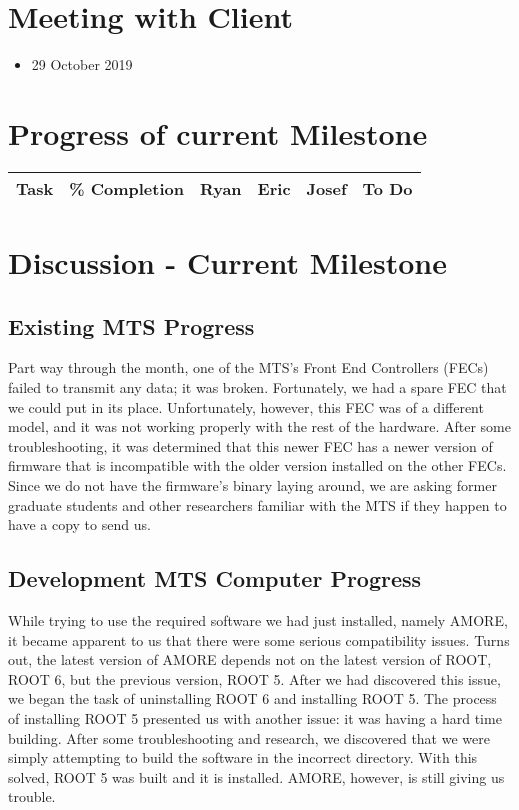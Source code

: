 \documentclass[12pt]{article}
\newcommand\tab[1][1cm]{\hspace*{#1}}
\begin{document}
\section{Meeting with Client}

\begin{itemize}
\item[] 29 October 2019
\end{itemize}

\section{Progress of current Milestone}

  \begin{center}
  \begin{tabular}{|c|c|c|c|c|c|}
    \hline
    Task & \% Completion & Ryan & Eric & Josef & To Do \\
    \hline

    \hline   
  \end{tabular}
\end{center}

\section{Discussion - Current Milestone}

\subsection{Existing MTS Progress}

\tab Part way through the month, one of the MTS's Front End Controllers (FECs)
failed to transmit any data; it was broken. Fortunately, we had a spare FEC that
we could put in its place. Unfortunately, however, this FEC was of a different
model, and it was not working properly with the rest of the hardware. After some
troubleshooting, it was determined that this newer FEC has a newer version of
firmware that is incompatible with the older version installed on the other
FECs. Since we do not have the firmware's binary laying around, we are asking
former graduate students and other researchers familiar with the MTS if they
happen to have a copy to send us. 

\subsection{Development MTS Computer Progress}

\tab While trying to use the required software we had just installed, namely
AMORE, it became apparent to us that there were some serious compatibility
issues. Turns out, the latest version of AMORE depends not on the latest version
of ROOT, ROOT 6, but the previous version, ROOT 5. After we had discovered this
issue, we began the task of uninstalling ROOT 6 and installing ROOT 5. The
process of installing ROOT 5 presented us with another issue: it was having a
hard time building. After some troubleshooting and research, we discovered that
we were simply attempting to build the software in the incorrect directory. With
this solved, ROOT 5 was built and it is installed. AMORE, however, is still
giving us trouble.
\end{document}
